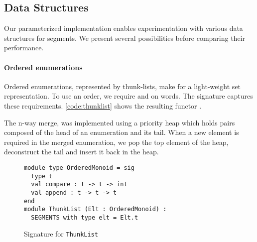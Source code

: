 \subsection{Data Structures}

Our parameterized implementation enables experimentation with various
data structures for segments. We present several possibilities before
comparing their performance.

\paragraph{Ordered enumerations}

Ordered enumerations, represented by thunk-lists, make
for a light-weight set representation.
To use an order, we require  and
 on words.  The  signature
captures these requirements. \autoref{code:thunklist} shows the
resulting functor .



The n-way merge, 
was implemented using a priority heap which holds pairs composed
of the head of an enumeration and its tail. When a new element is required in the
merged enumeration, we pop the top element of the heap, deconstruct
the tail and insert it back in the heap.


\begin{figure}[tp]
  \centering
\begin{lstlisting}
module type OrderedMonoid = sig
  type t
  val compare : t -> t -> int
  val append : t -> t -> t
end
module ThunkList (Elt : OrderedMonoid) :
  SEGMENTS with type elt = Elt.t
\end{lstlisting}
  \vspace{-\baselineskip}
  \caption{Signature for \texttt{ThunkList}}
  \label{code:thunklist}
\end{figure}

